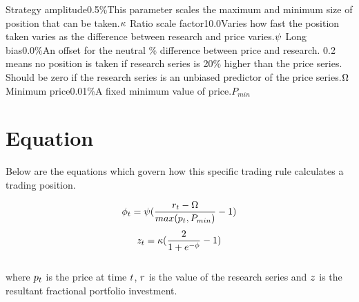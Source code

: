 \documentclass{article}
\begin{document}
{Strategy amplitude}{0.5\%}{This parameter scales the maximum and minimum size of position that can be taken.}{$\kappa$}
{Ratio scale factor}{10.0}{Varies how fast the position taken varies as the difference between research and price varies.}{$\psi$}
{Long bias}{0.0\%}{An offset for the neutral \% difference between price and research. 0.2 means no position is taken if research series is 20\% higher than the price series. Should be zero if the research series is an unbiased predictor of the price series.}{$\Omega$}
{Minimum price}{0.01\%}{A fixed minimum value of price.}{$P_{min}$}
\stoptable

\section{Equation}
Below are the equations which govern how this specific trading rule calculates a trading position.

\begin{equation}
\phi_t = \psi (\frac{r_t - \Omega}{max(p_t, P_{min})} - 1)
\end{equation}
\begin{equation}
z_t = \kappa ( \frac{2}{1 + e^{-\phi}} - 1 )
\end{equation}
\\ %
where $p_t$ is the price at time $t$, $r$ is the value of the research series and $z$ is the resultant fractional portfolio investment.

\hspace{200mm}
\hspace{200mm}
\end{document}
